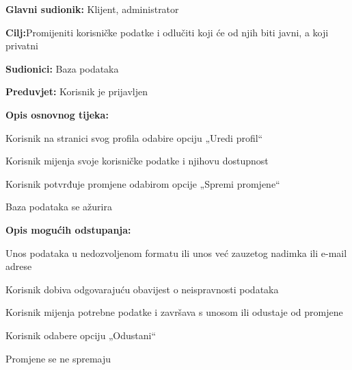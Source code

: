 						\begin{packed_item}
							
							\item \textbf{Glavni sudionik: }Klijent, administrator
							\item  \textbf{Cilj:}Promijeniti korisničke podatke i odlučiti koji će od njih biti javni, a koji privatni
							\item  \textbf{Sudionici:} Baza podataka
							\item  \textbf{Preduvjet:} Korisnik je prijavljen
							\item  \textbf{Opis osnovnog tijeka:}
							
							\item[] \begin{packed_enum}
								
								\item Korisnik na stranici svog profila odabire opciju „Uredi profil“
								\item Korisnik mijenja svoje korisničke podatke i njihovu dostupnost
								\item Korisnik potvrđuje promjene odabirom opcije „Spremi promjene“ 
								\item Baza podataka se ažurira 
								
								
							\end{packed_enum}
							
							\item  \textbf{Opis mogućih odstupanja:}
							
							\item[] \begin{packed_item}
								
								\item[2.a] Unos podataka u nedozvoljenom formatu ili unos već zauzetog nadimka ili e-mail adrese 
								\item[] \begin{packed_enum}
									
									\item Korisnik dobiva odgovarajuću obavijest o neispravnosti podataka 
									\item Korisnik mijenja potrebne podatke i završava s unosom ili odustaje od promjene 
									
								\end{packed_enum}
								\item[3.a] Korisnik odabere opciju „Odustani“
								\item[] \begin{packed_enum}
									
									\item Promjene se ne spremaju
									
								\end{packed_enum}
								
								
								
							\end{packed_item}
						\end{packed_item}
